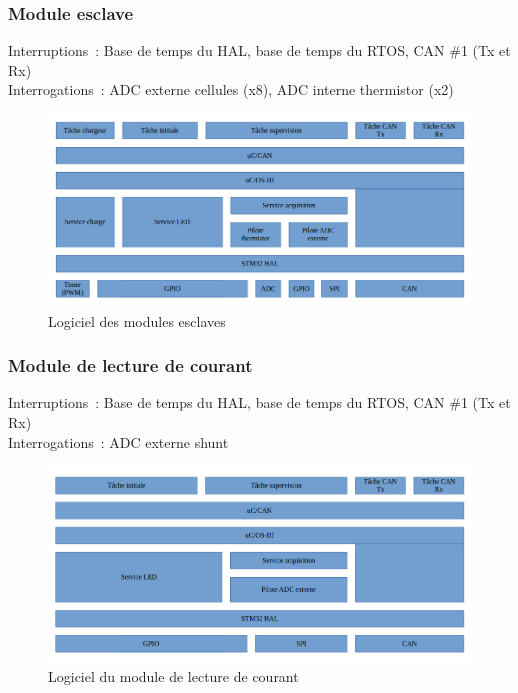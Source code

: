 	\subsubsection*{Module esclave}
		\noindent
		Interruptions : Base de temps du HAL, base de temps du RTOS, CAN \#1 (Tx et Rx) \\
		Interrogations : ADC externe cellules (x8), ADC interne thermistor (x2)
		\begin{figure}[H]
			\centering
			\includegraphics[scale=0.5]{Images/Logiciel_Slave.png}
			\caption{Logiciel des modules esclaves}
			\label{fig:logiciel_slave}
		\end{figure}
	\subsubsection*{Module de lecture de courant}
		\noindent
		Interruptions : Base de temps du HAL, base de temps du RTOS, CAN \#1 (Tx et Rx) \\
		Interrogations : ADC externe shunt
		\begin{figure}[H]
			\centering
			\includegraphics[scale=0.5]{Images/Logiciel_Current_Sense.png}
			\caption{Logiciel du module de lecture de courant}
			\label{fig:logiciel_current_sense}
		\end{figure}
